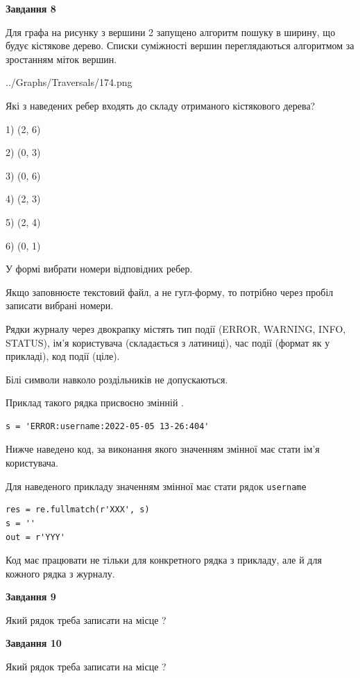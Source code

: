 \documentclass[12pt, ukrainian]{article}
\def\code#1{\Verb!#1!}
\begin{document}
{\begin {large}
{\begin {center}\textbf{Завдання 8}\end {center}}\par
Для графа на рисунку з вершини 2 запущено алгоритм пошуку в ширину, що будує кістякове дерево. Списки суміжності вершин переглядаються алгоритмом за зростанням міток вершин.\par
\begin{center}
	{../Graphs/Traversals/174.png}
\end{center}
\par Які з наведених ребер входять до складу отриманого кістякового дерева?\par
1) (2, 6)\par
2) (0, 3)\par
3) (0, 6)\par
4) (2, 3)\par
5) (2, 4)\par
6) (0, 1)\par
{\vskip 15pt} У формі вибрати номери відповідних ребер.


Якщо заповнюєте текстовий файл, а не гугл-форму, то потрібно через пробіл записа\-ти вибрані номери.\par
\newpage


Рядки журналу через двокрапку містять тип події (ERROR, WARNING, INFO, STATUS), ім'я користувача (складається з латиниці), час події (фор\-мат як у прикладі), код події (ціле).

Білі символи навколо роздільників не допускаються.

Приклад такого рядка присвоєно змінній .



\begin{verbatim}
s = 'ERROR:username:2022-05-05 13-26:404'
\end{verbatim}


Нижче наведено код, за виконання якого значенням змінної  має стати ім'я користувача.

Для наведеного прикладу значенням змінної  має стати рядок \code{username}



\begin{verbatim}
res = re.fullmatch(r'XXX', s)
s = ''
out = r'YYY'
\end{verbatim}


Код має працювати не тільки для конкретного рядка з прикладу, але й для кожного рядка з журналу.

{\begin {center}\textbf{Завдання 9}\end {center}}\par
Який рядок треба записати на місце  ?\par
\vspace{5mm}


{\begin {center}\textbf{Завдання 10}\end {center}}\par
Який рядок треба записати на місце  ?\par


\newpage


\end {large}}
\end{document}
